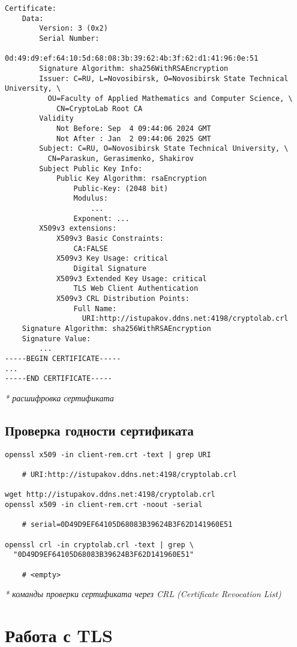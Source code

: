 \documentclass[12pt, a4paper]{article}
\begin{document}
\begin{verbatim}
Certificate:
    Data:
        Version: 3 (0x2)
        Serial Number:
            0d:49:d9:ef:64:10:5d:68:08:3b:39:62:4b:3f:62:d1:41:96:0e:51
        Signature Algorithm: sha256WithRSAEncryption
        Issuer: C=RU, L=Novosibirsk, O=Novosibirsk State Technical University, \
          OU=Faculty of Applied Mathematics and Computer Science, \
            CN=CryptoLab Root CA
        Validity
            Not Before: Sep  4 09:44:06 2024 GMT
            Not After : Jan  2 09:44:06 2025 GMT
        Subject: C=RU, O=Novosibirsk State Technical University, \
          CN=Paraskun, Gerasimenko, Shakirov
        Subject Public Key Info:
            Public Key Algorithm: rsaEncryption
                Public-Key: (2048 bit)
                Modulus:
                    ...
                Exponent: ...
        X509v3 extensions:
            X509v3 Basic Constraints:
                CA:FALSE
            X509v3 Key Usage: critical
                Digital Signature
            X509v3 Extended Key Usage: critical
                TLS Web Client Authentication
            X509v3 CRL Distribution Points:
                Full Name:
                  URI:http://istupakov.ddns.net:4198/cryptolab.crl
    Signature Algorithm: sha256WithRSAEncryption
    Signature Value:
        ...
-----BEGIN CERTIFICATE-----
...
-----END CERTIFICATE-----
\end{verbatim}
\textit{* расшифровка сертификата}

\subsection{Проверка годности сертификата}

\begin{verbatim}
openssl x509 -in client-rem.crt -text | grep URI

    # URI:http://istupakov.ddns.net:4198/cryptolab.crl

wget http://istupakov.ddns.net:4198/cryptolab.crl
openssl x509 -in client-rem.crt -noout -serial

    # serial=0D49D9EF64105D68083B39624B3F62D141960E51

openssl crl -in cryptolab.crl -text | grep \
  "0D49D9EF64105D68083B39624B3F62D141960E51"

    # <empty>
\end{verbatim}
\textit{* команды проверки сертификата через CRL (Certificate Revocation List) }

\section{Работа с TLS}
\end{document}
